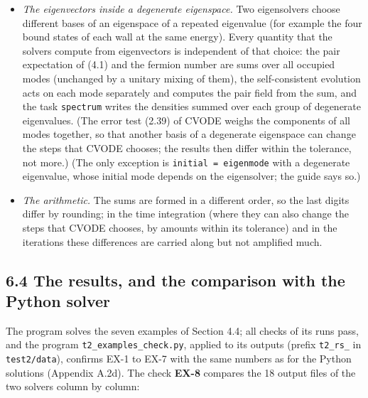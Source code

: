 \documentclass[
  10pt,
]{article}
\providecommand{\tightlist}{%
  \setlength{\itemsep}{0pt}\setlength{\parskip}{0pt}}
\begin{document}
\begin{itemize}
\tightlist
\item
  \emph{The eigenvectors inside a degenerate eigenspace.} Two
  eigensolvers choose different bases of an eigenspace of a repeated
  eigenvalue (for example the four bound states of each wall at the same
  energy). Every quantity that the solvers compute from eigenvectors is
  independent of that choice: the pair expectation of (4.1) and the
  fermion number are sums over all occupied modes (unchanged by a
  unitary mixing of them), the self-consistent evolution acts on each
  mode separately and computes the pair field from the sum, and the task
  \texttt{spectrum} writes the densities summed over each group of
  degenerate eigenvalues. (The error test (2.39) of CVODE weighs the
  components of all modes together, so that another basis of a
  degenerate eigenspace can change the steps that CVODE chooses; the
  results then differ within the tolerance, not more.) (The only
  exception is \texttt{initial\ =\ eigenmode} with a degenerate
  eigenvalue, whose initial mode depends on the eigensolver; the guide
  says so.)
\item
  \emph{The arithmetic.} The sums are formed in a different order, so
  the last digits differ by rounding; in the time integration (where
  they can also change the steps that CVODE chooses, by amounts within
  its tolerance) and in the iterations these differences are carried
  along but not amplified much.
\end{itemize}

\hypertarget{the-results-and-the-comparison-with-the-python-solver}{%
\subsection{6.4 The results, and the comparison with the Python
solver}\label{the-results-and-the-comparison-with-the-python-solver}}

The program solves the seven examples of Section 4.4; all checks of its
runs pass, and the program \texttt{t2\_examples\_check.py}, applied to
its outputs (prefix \texttt{t2\_rs\_} in \texttt{test2/data}), confirms
EX-1 to EX-7 with the same numbers as for the Python solutions (Appendix
A.2d). The check \textbf{EX-8} compares the 18 output files of the two
solvers column by column:
\end{document}
